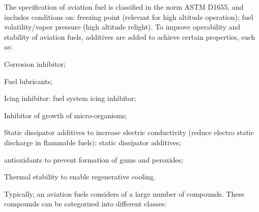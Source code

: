 The specification of aviation fuel is classified in the norm ASTM D1655, and includes conditions on: freezing point (relevant for high altitude operation); fuel volatility/vapor pressure (high altitude relight). To improve operability and stability of aviation fuels, additives are added to achieve certain properties, such as:
\begin{itemizePacked}
\item Corrosion inhibitor;
\item Fuel lubricants;
\item Icing inhibitor: fuel system icing inhibitor;
\item Inhibitor of growth of micro-organisms;
\item Static dissipator additives to increase electric conductivity (reduce electro static discharge in flammable fuels): static dissipator additives;
\item antioxidants to prevent formation of gums and peroxides;
\item Thermal stability to enable regenerative cooling.
\end{itemizePacked}
Typically, an aviation fuels considers of a large number of compounds. These compounds can be categorized into different classes:
